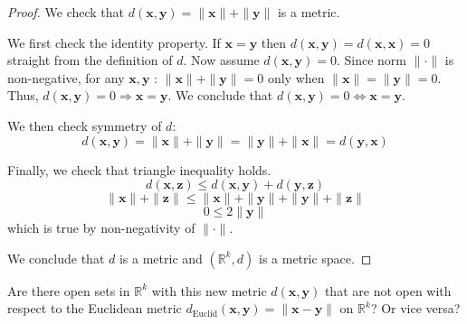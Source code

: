\documentclass{article}
\begin{document}
\begin{proof}
We check that $d(\mathbf{x}, \mathbf{y}) = \|\mathbf{x}\| + \|\mathbf{y}\|$ is a metric.

We first check the identity property. If $\mathbf{x} = \mathbf{y}$ then $d(\mathbf{x}, \mathbf{y}) = d(\mathbf{x}, \mathbf{x}) = 0$ straight from the definition of $d$. Now assume $d(\mathbf{x}, \mathbf{y}) = 0$. Since norm $\| \cdot \|$ is non-negative, for any $\mathbf{x}, \mathbf{y}$ : $\|\mathbf{x}\| + \|\mathbf{y}\| = 0$ only when $\|\mathbf{x}\| = \|\mathbf{y}\| = 0$. Thus, $d(\mathbf{x}, \mathbf{y}) = 0 \Rightarrow \mathbf{x} = \mathbf{y}$. We conclude that $d(\mathbf{x}, \mathbf{y}) = 0 \iff \mathbf{x} = \mathbf{y}$.

We then check symmetry of $d$:
$$ d(\mathbf{x}, \mathbf{y}) = \|\mathbf{x}\| + \|\mathbf{y}\| = \|\mathbf{y}\| + \|\mathbf{x}\| = d(\mathbf{y}, \mathbf{x}) $$

Finally, we check that triangle inequality holds.
$$ d(\mathbf{x}, \mathbf{z}) \leq d(\mathbf{x}, \mathbf{y}) + d(\mathbf{y}, \mathbf{z}) $$
$$ \|\mathbf{x}\| + \|\mathbf{z}\| \leq \|\mathbf{x}\| + \|\mathbf{y}\| + \|\mathbf{y}\| + \|\mathbf{z}\| $$
$$ 0 \leq 2\|\mathbf{y}\| $$
which is true by non-negativity of $\| \cdot \|$.

We conclude that $d$ is a metric and $(\mathbb{R}^k, d)$ is a metric space.
\end{proof}

\begin{tcolorbox}
Are there open sets in $\mathbb{R}^k$ with this new metric $d(\mathbf{x}, \mathbf{y})$ that are not open with respect to the Euclidean metric $d_\text{Euclid}(\mathbf{x}, \mathbf{y}) = \|\mathbf{x} - \mathbf{y}\|$ on $\mathbb{R}^k$? Or vice versa?
\end{tcolorbox}
\end{document}
